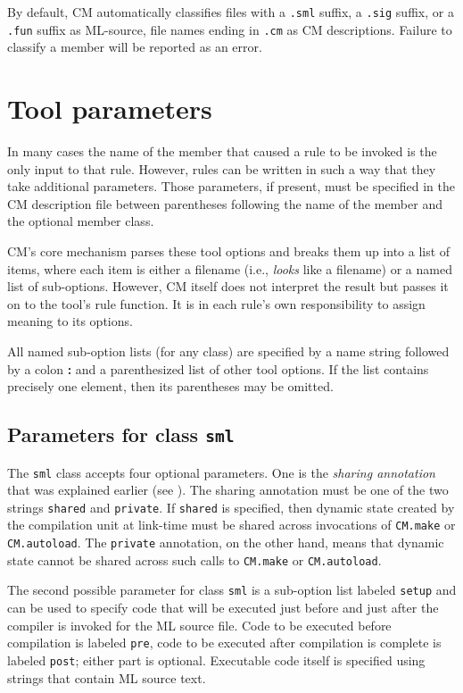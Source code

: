 By default, CM automatically classifies files with a {\tt .sml}
suffix, a {\tt .sig} suffix, or a {\tt .fun} suffix as ML-source, file
names ending in {\tt .cm} as CM descriptions.  Failure to classify a
member will be reported as an error.

\section{Tool parameters}
\label{sec:toolparam}

In many cases the name of the member that caused a rule to be invoked
is the only input to that rule.  However, rules can be written in such
a way that they take additional parameters.  Those parameters, if
present, must be specified in the CM description file between
parentheses following the name of the member and the optional member
class.

CM's core mechanism parses these tool options and breaks them up into
a list of items, where each item is either a filename (i.e., {\em
looks} like a filename) or a named list of sub-options.  However, CM
itself does not interpret the result but passes it on to the tool's
rule function.  It is in each rule's own responsibility to assign
meaning to its options.

All named sub-option lists (for any class) are specified by a name
string followed by a colon {\bf :} and a parenthesized list of other
tool options.  If the list contains precisely one element, then its
parentheses may be omitted.

\subsection{Parameters for class {\tt sml}}
\label{sec:toolparam:sml}

The {\tt sml} class accepts four optional parameters.  One is the {\em
sharing annotation} that was explained earlier (see
).  The sharing annotation must be one of the
two strings {\tt shared} and {\tt private}.  If {\tt shared} is
specified, then dynamic state created by the compilation unit at
link-time must be shared across invocations of {\tt CM.make} or {\tt
CM.autoload}.  The {\tt private} annotation, on the other hand, means
that dynamic state cannot be shared across such calls to {\tt CM.make}
or {\tt CM.autoload}.

The second possible parameter for class {\tt sml} is a sub-option
list labeled {\tt setup} and can be used to specify code that will be
executed just before and just after the compiler is invoked for the
ML source file.  Code to be executed before compilation is labeled
{\tt pre}, code to be executed after compilation is complete is
labeled {\tt post}; either part is optional.  Executable code itself
is specified using strings that contain ML source text.

